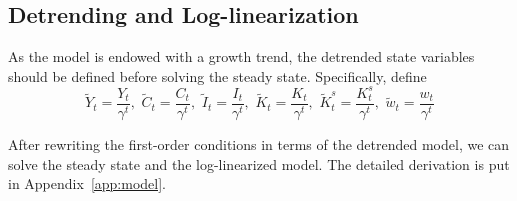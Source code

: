 \subsection{Detrending and Log-linearization}
As the model is endowed with a growth trend, the detrended state variables should be defined before solving the steady state. Specifically, define
\begin{equation}
    \tilde{Y}_t = \frac{Y_t}{\gamma^t},\,\,
    \tilde{C}_t = \frac{C_t}{\gamma^t},\,\,
    \tilde{I}_t = \frac{I_t}{\gamma^t},\,\,
    \tilde{K}_t = \frac{K_t}{\gamma^t},\,\,
    \tilde{K}^s_t = \frac{K_t^s}{\gamma^t},\,\,
    \tilde{w}_t = \frac{w_t}{\gamma^t}
\end{equation}

After rewriting the first-order conditions in terms of the detrended model, we can solve the steady state and the log-linearized model. The detailed derivation is put in Appendix~\ref{app:model}. 